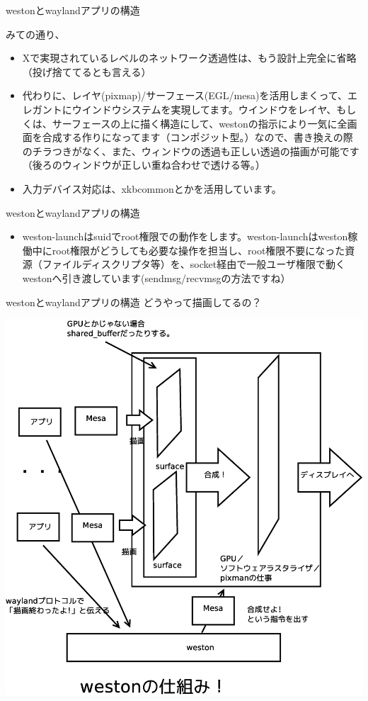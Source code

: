 \begin{frame}{westonとwaylandアプリの構造}

みての通り、

\begin{itemize}
\item Xで実現されているレベルのネットワーク透過性は、もう設計上完全に省略（投げ捨ててるとも言える）
\item 代わりに、レイヤ(pixmap)/サーフェース(EGL/mesa)を活用しまくって、エレガントにウインドウシステムを実現してます。ウインドウをレイヤ、もしくは、サーフェースの上に描く構造にして、westonの指示により一気に全画面を合成する作りになってます（コンポジット型。）なので、書き換えの際のチラつきがなく、また、ウィンドウの透過も正しい透過の描画が可能です
（後ろのウィンドウが正しい重ね合わせで透ける等。）
\item 入力デバイス対応は、xkbcommonとかを活用しています。
\end{itemize}

\end{frame}

\begin{frame}{westonとwaylandアプリの構造}

\begin{itemize}
\item weston-launchはsuidでroot権限での動作をします。weston-launchはweston稼働中にroot権限がどうしても必要な操作を担当し、root権限不要になった資源（ファイルディスクリプタ等）を、socket経由で一般ユーザ権限で動くwestonへ引き渡しています(sendmsg/recvmsgの方法ですね）
\end{itemize}

\end{frame}

\begin{frame}{westonとwaylandアプリの構造}
どうやって描画してるの？
\begin{center}
\includegraphics[width=0.6\hsize]{image201311/wayland-composite-explain.eps}
\end{center}
\end{frame}


